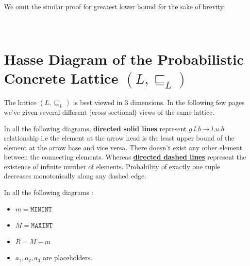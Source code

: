 \documentclass[final,3p, review, times]{util/elsarticle}
\begin{document}
We omit the similar proof for greatest lower bound for the sake of brevity.










\newpage
\section{\\Hasse Diagram of the Probabilistic Concrete Lattice $(L,\sqsubseteq_L)$}
\label{app:concrete_hasse}

The lattice $(L,\sqsubseteq_L)$ is best viewed in 3 dimensions. In the following few pages we've given several different (cross sectional) views of the same lattice.

In all the following diagrams, \underline{\textbf{directed solid lines}} represent $g.l.b\to l.u.b$ relationship i.e the element at the arrow head is the least upper bound of the element at the arrow base and vice versa. There doesn't exist any other element between the connecting elements. Whereas \underline{\textbf{directed dashed lines}} represent the existence of infinite number of elements. Probability of exactly one tuple decreases monotonically along any dashed edge.

In all the following diagrams :
\begin{itemize}
  \item $m=\mathtt{MININT}$
  \item $M=\mathtt{MAXINT}$
  \item $R=M-m$
  \item $a_1,a_2,a_3$ are placeholders.
\end{itemize}
\end{document}
